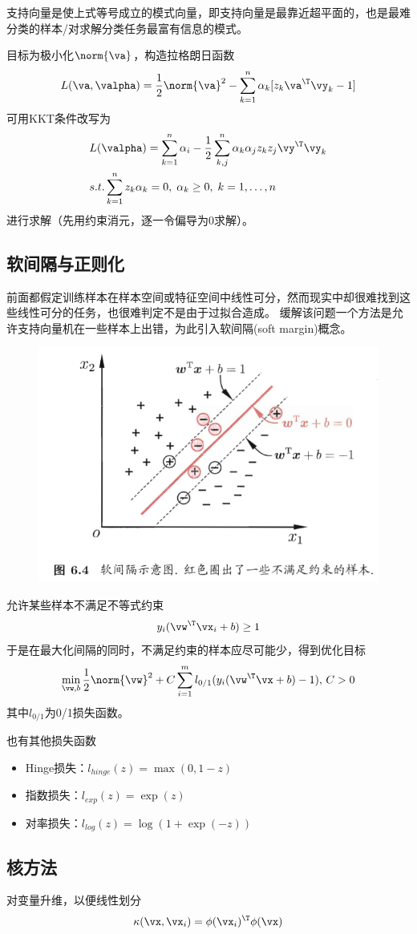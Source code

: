 支持向量是使上式等号成立的模式向量，即支持向量是最靠近超平面的，也是最难分类的样本/对求解分类任务最富有信息的模式。

目标为极小化$\norm{\va}$，构造拉格朗日函数
\[L(\va,\valpha)=\frac{1}{2}\norm{\va}^2-\sum_{k=1}^n\alpha_k[z_k\va^\T\vy_k-1]\]
可用KKT条件改写为
\[\begin{aligned}
&L(\valpha)=\sum_{k=1}^n\alpha_i-\frac{1}{2}\sum_{k,j}^n\alpha_k\alpha_jz_kz_j\vy^\T\vy_k\\
&s.t.\sum_{k=1}^nz_k\alpha_k=0,\;\alpha_k\geq 0,\;k=1,\ldots,n
\end{aligned}\]
进行求解（先用约束消元，逐一令偏导为$0$求解）。

\subsection{软间隔与正则化}
前面都假定训练样本在样本空间或特征空间中线性可分，然而现实中却很难找到这些线性可分的任务，也很难判定不是由于过拟合造成。
缓解该问题一个方法是允许支持向量机在一些样本上出错，为此引入软间隔(soft margin)概念。
\begin{figure}[H]
\centering
\includegraphics[width=0.6\linewidth]{fig/soft_margin.png}
\end{figure}

允许某些样本不满足不等式约束
\[y_i(\vw^\T\vx_i+b)\geq 1\]
于是在最大化间隔的同时，不满足约束的样本应尽可能少，得到优化目标
\[\min_{\vw,b}\frac{1}{2}\norm{\vw}^2+C\sum_{i=1}^ml_{0/1}(y_i(\vw^\T\vx+b)-1),\,C>0\]
其中$l_{0/1}$为0/1损失函数。

也有其他损失函数
\begin{itemize}
	\item Hinge损失：$l_{hinge}(z)=\max(0,1-z)$
	\item 指数损失：$l_{exp}(z)=\exp(z)$
	\item 对率损失：$l_{log}(z)=\log(1+\exp(-z))$
\end{itemize}

\subsection{核方法}
对变量升维，以便线性划分
\[\kappa(\vx,\vx_i)=\phi(\vx_i)^\T\phi(\vx)\]

